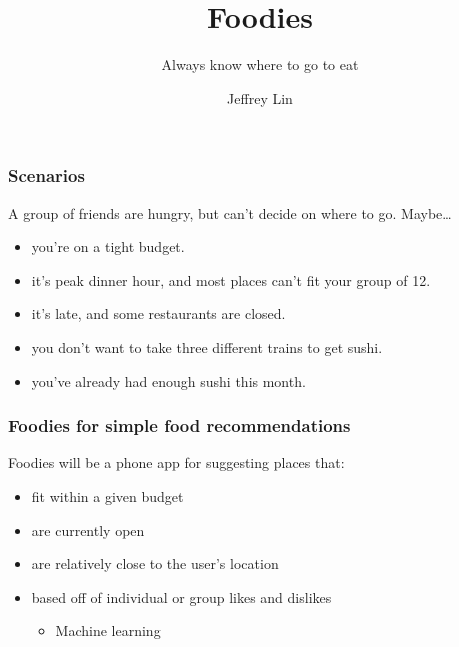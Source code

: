 \documentclass{beamer}
\title{Foodies}
\subtitle{Always know where to go to eat}
\author{Jeffrey Lin}
\institute{CSCI 49900 / 03}
\begin{document}
\frame{\titlepage}

\begin{frame}
  \frametitle{Scenarios}
  A group of friends are hungry, but can't decide on where to go. Maybe\dots \pause%

  \begin{itemize}
    \item you're on a tight budget. \pause%
    \item it's peak dinner hour, and most places can't fit your group of 12. \pause%
    \item it's late, and some restaurants are closed. \pause%
    \item you don't want to take three different trains to get sushi. \pause%
    \item you've already had enough sushi this month.
  \end{itemize}
\end{frame}

\begin{frame}
  \frametitle{Foodies for simple food recommendations}
  Foodies will be a phone app for suggesting places that: \pause%
  \begin{itemize}
    \item fit within a given budget \pause%
    \item are currently open \pause%
    \item are relatively close to the user's location \pause%
    \item based off of individual or group likes and dislikes \pause%
      \begin{itemize}
        \item Machine learning
      \end{itemize}
  \end{itemize}
\end{frame}
\end{document}
